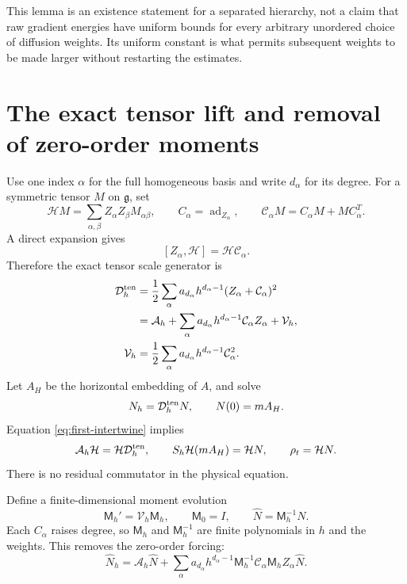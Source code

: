 \documentclass[11pt,a4paper]{amsart}
\numberwithin{equation}{section}
\theoremstyle{remark}\newtheorem{remark}[theorem]{Remark}
\newcommand{\ad}{\operatorname{ad}}
\newcommand{\cH}{\mathcal H}
\newcommand{\cA}{\mathcal A}
\newcommand{\cD}{\mathcal D}
\newcommand{\cV}{\mathcal V}
\newcommand{\cC}{\mathcal C}
\newcommand{\Mom}{\mathsf M}
\begin{document}
This lemma is an existence statement for a separated hierarchy, not a claim
that raw gradient energies have uniform bounds for every arbitrary unordered
choice of diffusion weights. Its uniform constant is what permits subsequent
weights to be made larger without restarting the estimates.

\section{The exact tensor lift and removal of zero-order moments}
Use one index $\alpha$ for the full homogeneous basis and write $d_\alpha$ for
its degree. For a symmetric tensor $M$ on $\mathfrak g$, set
\[
 \cH M=\sum_{\alpha,\beta}Z_\alpha Z_\beta M_{\alpha\beta},\qquad
 C_\alpha=\ad_{Z_\alpha},\qquad
 \cC_\alpha M=C_\alpha M+MC_\alpha^T.
\]
A direct expansion gives
\begin{equation}\label{eq:first-intertwine}
 [Z_\alpha,\cH]=\cH\cC_\alpha.
\end{equation}
Therefore the exact tensor scale generator is
\begin{align}
 \cD_h^{\rm ten}
 &=\frac12\sum_\alpha a_{d_\alpha}h^{d_\alpha-1}
                         (Z_\alpha+\cC_\alpha)^2\notag\\
 &=\cA_h+\sum_\alpha a_{d_\alpha}h^{d_\alpha-1}
                  \cC_\alpha Z_\alpha+\cV_h,\label{eq:tensorgen}\\
 \cV_h&=\frac12\sum_\alpha a_{d_\alpha}h^{d_\alpha-1}\cC_\alpha^2.
\end{align}
Let $A_H$ be the horizontal embedding of $A$, and solve
\[
 N_h=\cD_h^{\rm ten}N,\qquad N(0)=mA_H.
\]
Equation \eqref{eq:first-intertwine} implies
\begin{equation}\label{eq:physical-lift}
 \cA_h\cH=\cH\cD_h^{\rm ten},\qquad
 S_h\cH(mA_H)=\cH N,\qquad \rho_t=\cH N.
\end{equation}
There is no residual commutator in the physical equation.

Define a finite-dimensional moment evolution
\begin{equation}\label{eq:moment}
 \Mom_h'=\cV_h\Mom_h,\qquad \Mom_0=I,
 \qquad \widehat N=\Mom_h^{-1}N.
\end{equation}
Each $C_\alpha$ raises degree, so $\Mom_h$ and $\Mom_h^{-1}$ are finite
polynomials in $h$ and the weights. This removes the zero-order forcing:
\begin{equation}\label{eq:renormalized-N}
 \widehat N_h=\cA_h\widehat N+
 \sum_\alpha a_{d_\alpha}h^{d_\alpha-1}
     \Mom_h^{-1}\cC_\alpha\Mom_h Z_\alpha\widehat N.
\end{equation}
\end{document}
